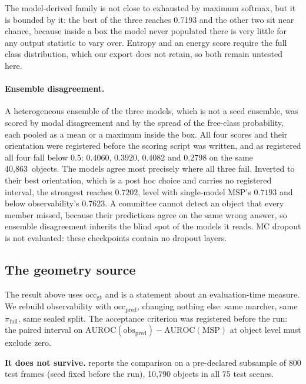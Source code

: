 \documentclass[10pt,twocolumn,letterpaper]{article}
\newcommand{\objObs}{0.7623}
\newcommand{\nObj}{40{,}863}
\begin{document}
The model-derived family is not close to exhausted by maximum softmax, but
it is bounded by it: the best of the three reaches 0.7193 and the other two
sit near chance, because inside a box the model never populated there is
very little for any output statistic to vary over. Entropy and an energy
score require the full class distribution, which our export does not
retain, so both remain untested here.

\paragraph{Ensemble disagreement.}
A heterogeneous ensemble of the three models, which is not a seed ensemble,
was scored by modal disagreement and by the spread of the free-class
probability, each pooled as a mean or a maximum inside the box. All four
scores and their orientation were registered before the scoring script was
written, and as registered all four fall below $0.5$: $0.4060$, $0.3920$,
$0.4082$ and $0.2798$ on the same \nObj\ objects. The models agree most
precisely where all three fail. Inverted to their best orientation, which is a post hoc choice and carries
no registered interval, the strongest reaches $0.7202$, level with
single-model MSP's $0.7193$ and below observability's \objObs. A committee cannot detect an object that every
member missed, because their predictions agree on the same wrong answer,
so ensemble disagreement inherits the blind spot of the models it reads.
MC dropout is not evaluated: these checkpoints contain no dropout layers.

\subsection{The geometry source}
\label{sec:deployable}
The result above uses $\text{occ}_{\text{gt}}$ and is a statement about an
evaluation-time measure. We rebuild observability with
$\text{occ}_{\text{pred}}$, changing nothing else: same marcher, same
$\pi_{\text{full}}$, same sealed split. The acceptance criterion was
registered before the run: the paired interval on
$\mathrm{AUROC}(\text{obs}_{\text{pred}}) - \mathrm{AUROC}(\text{MSP})$ at
object level must exclude zero.

\textbf{It does not survive.}  reports the comparison on
a pre-declared subsample of 800 test frames (seed fixed before the run),
10{,}790 objects in all 75 test scenes.
\end{document}
